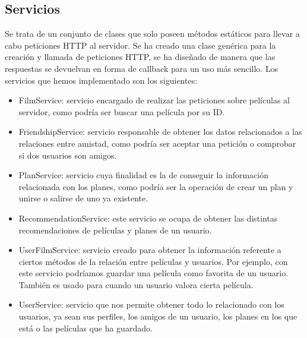 \subsection{Servicios}
\label{makereference4.4.6}
Se trata de un conjunto de clases que solo poseen métodos estáticos para llevar a cabo peticiones HTTP al servidor. Se ha creado una clase genérica para la creación y llamada de peticiones HTTP, se ha diseñado de manera que las respuestas se devuelvan en forma de callback para un uso más sencillo.
Los servicios que hemos implementado son los siguientes:
\begin{itemize}
    \item FilmService: servicio encargado de realizar las peticiones sobre películas al servidor, como podría ser buscar una película por su ID.
    \item FriendshipService: servicio responsable de obtener los datos relacionados a las relaciones entre amistad, como podría ser aceptar una petición o comprobar si dos usuarios son amigos.
    \item PlanService: servicio cuya finalidad es la de conseguir la información relacionada con los planes, como podría ser la operación de crear un plan y unirse o salirse de uno ya existente.
    \item RecommendationService: este servicio se ocupa de obtener las distintas recomendaciones de películas y planes de un usuario.
    \item UserFilmService: servicio creado para obtener la información referente a ciertos métodos de la relación entre películas y usuarios. Por ejemplo, con este servicio podríamos guardar una película como favorita de un usuario. También es usado para cuando un usuario valora cierta película.
    \item UserService: servicio que nos permite obtener todo lo relacionado con los usuarios, ya sean sus perfiles, los amigos de un usuario, los planes en los que está o las películas que ha guardado.
\end{itemize}

